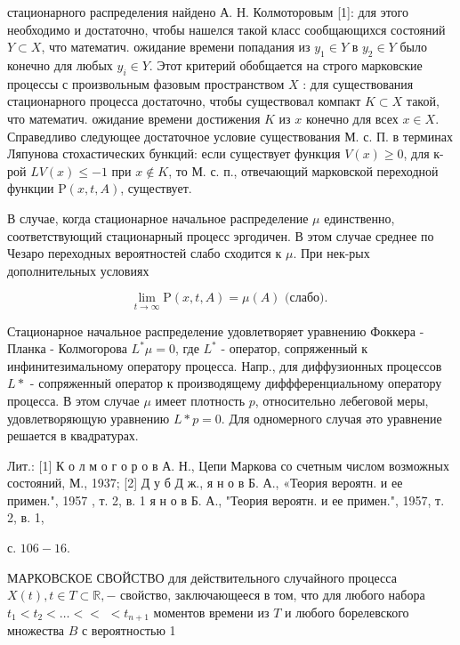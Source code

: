 \documentclass[10pt]{article}
\begin{document}
стационарного распределения найдено А. Н. Колмоторовым [1]: для этого необходимо и достаточно, чтобы нашелся такой класс сообщающихся состояний $Y \subset X$, что математич. ожидание времени попадания из $y_{1} \in Y$ в $y_{2} \in Y$ было конечно для любых $y_{i} \in Y$. Этот критерий обобщается на строго марковские процессы с произвольным фазовым пространством $X$ : для существования стационарного процесса достаточно, чтобы существовал компакт $K \subset X$ такой, что математич. ожидание времени достижения $K$ из $x$ конечно для всех $x \in X$. Справедливо следующее достаточное условие существования М. с. П. в терминах Ляпунова стохастических бункций: если существует функция $V(x) \geqslant 0$, для к-рой $L V(x) \leqslant-1$ при $x \notin K$, то М. с. п., отвечающий марковской переходноӥ функции $\mathrm{P}(x, t, A)$, существует.



В случае, когда стационарное начальное распределение $\mu$ единственно, соответствующий стационарный процесс эргодичен. В этом случае среднее по Чезаро переходных вероятностей слабо сходится к $\mu$. При нек-рых дополнительных условиях



\[

\lim _{t \rightarrow \infty} \mathrm{P}(x, t, A)=\mu(A) \text { (слабо). }

\]



Стационарное начальное распределение удовлетворяет уравнению Фоккера - Планка - Колмогорова $L^{*} \mu=0$, где $L^{*}$ - оператор, сопряженный к инфинитезимальному оператору процесса. Напр., для диффузионных процессов $L *$ - сопряженный оператор к производящему диффференциальному оператору процесса. В этом случае $\mu$ имеет плотность $p$, относительно лебеговой меры, удовлетворяющую уравнению $L * p=0$. Для одномерного случая әто уравнение решается в квадратурах.



Лит.: [1] К о л м о г о р о в А. Н., Цепи Маркова со счетным числом возможных состояний, М., 1937; [2] Д у б Д ж., я н о в Б. А., «Теория вероятн. и ее примен.", 1957 , т. 2, в. 1 я н о в Б. А., "Теория вероятн. и ее примен.", 1957, т. 2, в. 1,

с. $106-16$.



МАРКОВСКОЕ СВОЙСТВО для действительного случайного процесса $X(t), t \in T \subset \mathbb{R},-$ свойство, заключающееся в том, что для любого набора $t_{1}<t_{2}<\ldots<<$ $<t_{n+1}$ моментов времени из $T$ и любого борелевского множества $B$ с вероятностью 1
\end{document}
